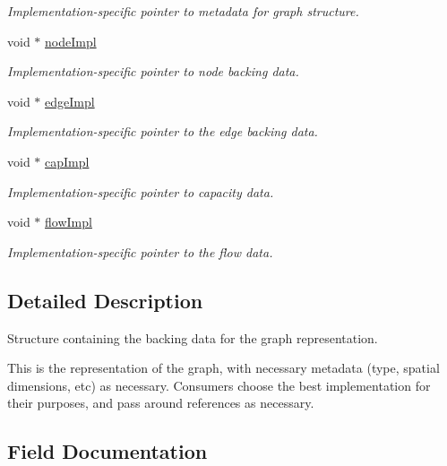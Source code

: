 \begin{DoxyCompactItemize}
\begin{DoxyCompactList}\small\item\em Implementation-\/specific pointer to metadata for graph structure. \end{DoxyCompactList}\item 
void $\ast$ \hyperlink{structgraph__t_a3bf6344f03f4cbc69345d026da2e3368}{node\+Impl}
\begin{DoxyCompactList}\small\item\em Implementation-\/specific pointer to node backing data. \end{DoxyCompactList}\item 
void $\ast$ \hyperlink{structgraph__t_acadea26a56e788cb109413045138faba}{edge\+Impl}
\begin{DoxyCompactList}\small\item\em Implementation-\/specific pointer to the edge backing data. \end{DoxyCompactList}\item 
void $\ast$ \hyperlink{structgraph__t_ab85359c7dfbc46f84976a85c4104b1f5}{cap\+Impl}
\begin{DoxyCompactList}\small\item\em Implementation-\/specific pointer to capacity data. \end{DoxyCompactList}\item 
void $\ast$ \hyperlink{structgraph__t_aff85993441e72a7815da3fa1b048e5eb}{flow\+Impl}
\begin{DoxyCompactList}\small\item\em Implementation-\/specific pointer to the flow data. \end{DoxyCompactList}\end{DoxyCompactItemize}


\subsection{Detailed Description}
Structure containing the backing data for the graph representation. 

This is the representation of the graph, with necessary metadata (type, spatial dimensions, etc) as necessary. Consumers choose the best implementation for their purposes, and pass around references as necessary. 

\subsection{Field Documentation}
\mbox{\label{structgraph__t_ab85359c7dfbc46f84976a85c4104b1f5}} 

